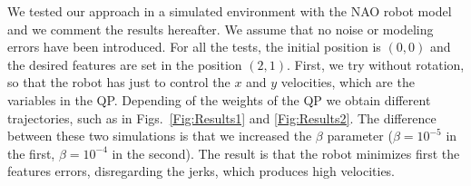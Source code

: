 \label{sec:results}

We tested our approach in a simulated environment with the NAO robot model and we comment the results hereafter. We assume that no noise or modeling errors have been introduced. For all the tests, the initial position is $(0,0)$ and the desired features are set in the position $(2,1)$. First, we try without rotation, so that the robot has just to control the $x$ and $y$ velocities, which are the variables in the QP. Depending of the weights of the QP we obtain different trajectories, such as in Figs.~\ref{Fig:Results1} and \ref{Fig:Results2}. The difference between these two simulations is that we increased the $\beta $ parameter ($\beta=10^{-5}$ in the first, $\beta =10^{-4}$ in the second). The result is that the robot minimizes first the features errors, disregarding the jerks, which produces high velocities.


